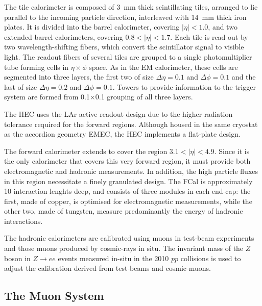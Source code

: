 The tile calorimeter is composed of 3~mm thick scintillating tiles, arranged to lie parallel  to the incoming particle direction, interleaved with 14~mm thick iron plates. %
It is divided into the barrel calorimeter, covering $|\eta|<1.0$, and two extended barrel calorimeters, covering  $0.8 < |\eta| <1.7$. Each tile is read out by two wavelength-shifting fibers, which convert the scintillator signal to visible light. The readout fibers of several tiles are grouped to a single photomultiplier tube forming cells in $\eta \times \phi$ space. As in the EM calorimeter, these cells are segmented into three layers, the first two of size $\Delta \eta = 0.1$ and  $\Delta \phi = 0.1$ and the last of size   $\Delta \eta = 0.2$ and  $\Delta \phi = 0.1$.  Towers to provide information to the trigger system are formed from 0.1$\times$0.1 grouping of all three layers.

The HEC uses the LAr active readout design due to the higher radiation tolerance required for the forward regions.  Although housed in the same cryostat as the accordion geometry EMEC, the HEC implements a flat-plate design.

The forward calorimeter extends to cover the region $3.1<|\eta|<4.9$. Since it is the only calorimeter that covers this very forward region, it must provide both electromagnetic and hadronic measurements. In addition, the high particle fluxes in this region necessitate a finely granulated design. The FCal is approximately 10 interaction lenghts deep, and consists of three modules in each end-cap: the first, made of copper, is optimised for electromagnetic measurements, while the other two, made of tungsten, measure predominantly the energy of hadronic interactions.

The hadronic calorimeters are calibrated using muons in test-beam experiments %
and those muons produced by cosmic-rays in situ. %
The invariant mass of the $Z$ boson in $Z \rightarrow ee$ events measured in-situ in the 2010 $pp$ collisions is used to adjust the calibration derived from test-beams and cosmic-muons.





\subsection{The Muon System}\label{sec:Muon}
 
